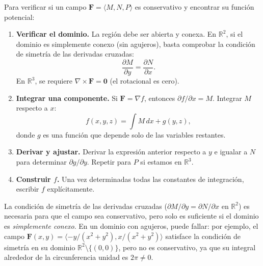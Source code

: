 \begin{pasos}
Para verificar si un campo $\mathbf{F}=\langle M,N,P \rangle$ es
conservativo y encontrar su función potencial:
\begin{enumerate}
    \item \textbf{Verificar el dominio.} La región debe ser abierta y
    conexa. En $\mathbb{R}^2$, si el dominio es simplemente conexo
    (sin agujeros), basta comprobar la condición de simetría de las
    derivadas cruzadas:
    \[
    \frac{\partial M}{\partial y} = \frac{\partial N}{\partial x}.
    \]
    En $\mathbb{R}^3$, se requiere $\nabla \times \mathbf{F} = \mathbf{0}$
    (el rotacional es cero).
    \item \textbf{Integrar una componente.} Si $\mathbf{F} = \nabla f$,
    entonces $\partial f/\partial x = M$. Integrar $M$ respecto a $x$:
    \[
    f(x,y,z) = \int M\,dx + g(y,z),
    \]
    donde $g$ es una función que depende solo de las variables
    restantes.
    \item \textbf{Derivar y ajustar.} Derivar la expresión anterior
    respecto a $y$ e igualar a $N$ para determinar $\partial g/\partial y$.
    Repetir para $P$ si estamos en $\mathbb{R}^3$.
    \item \textbf{Construir $f$.} Una vez determinadas todas las
    constantes de integración, escribir $f$ explícitamente.
\end{enumerate}
\end{pasos}

\begin{rem}
La condición de simetría de las derivadas cruzadas ($\partial M/\partial
y = \partial N/\partial x$ en $\mathbb{R}^2$) es necesaria para que el
campo sea conservativo, pero solo es suficiente si el dominio es
\emph{simplemente conexo}. En un dominio con agujeros, puede fallar:
por ejemplo, el campo $\mathbf{F}(x,y) = \langle -y/(x^2+y^2),
x/(x^2+y^2) \rangle$ satisface la condición de simetría en su dominio
$\mathbb{R}^2\setminus\{(0,0)\}$, pero no es conservativo, ya que su
integral alrededor de la circunferencia unidad es $2\pi \neq 0$.
\end{rem}

